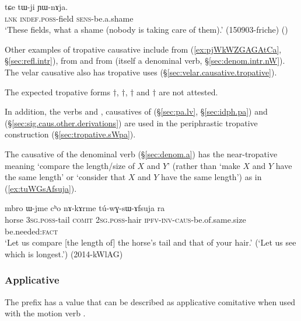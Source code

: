 \begin{exe}
\ex \label{ex:tWji.YWnAja}
\gll  tɕe tɯ-ji ɲɯ-nɤja.   \\
\textsc{lnk} \textsc{indef}.\textsc{poss}-field \textsc{sens}-be.a.shame \\
\glt `These fields, what a shame (nobody is taking care of them).' (150903-friche)
()
 \end{exe}
 

Other examples of tropative causative include  from  (\ref{ex:pjWkWZGAGAtCa}, §\ref{sec:refl.intr}),   from  and   from  (itself a denominal verb, §\ref{sec:denom.intr.nW}). The velar causative also has tropative uses (§\ref{sec:velar.causative.tropative}).

 The expected tropative forms $\dagger$, $\dagger$, $\dagger$ and $\dagger$ are not attested.

In addition, the verbs  and , causatives of  (§\ref{sec:pa.lv}, §\ref{sec:idph.pa}) and  (§\ref{sec:sig.caus.other.derivations}) are used in the periphrastic tropative construction (§\ref{sec:tropative.sWpa}).

The causative of the denominal verb  (§\ref{sec:denom.a}) has the near-tropative meaning `compare the length/size of $X$ and $Y$' (rather than `make $X$ and $Y$ have the same length' or `consider that $X$ and $Y$ have the same length') as in  (\ref{ex:tuWGsAfsuja}).

\begin{exe}
\ex \label{ex:tuWGsAfsuja}
\gll mbro ɯ-jme cʰo nɤ-kɤrme tú-wɣ-sɯ-ɤfsuja ra \\
horse \textsc{3sg}.\textsc{poss}-tail \textsc{comit} \textsc{2sg}.\textsc{poss}-hair \textsc{ipfv}-\textsc{inv}-\textsc{caus}-be.of.same.size be.needed:\textsc{fact} \\
\glt `Let us compare [the length of] the horse's tail and that of your hair.' (`Let us see which is longest.') (2014-kWlAG)
\end{exe}  

\subsubsection{Applicative} \label{sec:sig.caus.appl.comitative}
The  prefix has a value that can be described as applicative comitative when used with the motion verb . 

